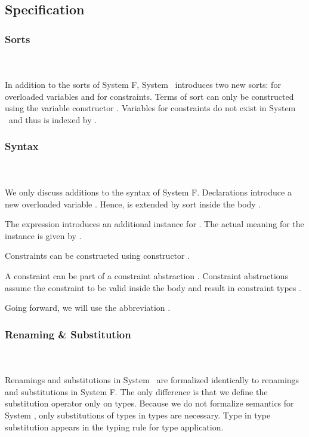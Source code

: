 \subsection{Specification}

\subsubsection{Sorts}\hfill\\\\
In addition to the sorts of System F, System \Fo\ introduces two new sorts:  for overloaded variables and  for constraints.
\FoSort
Terms of sort  can only be constructed using the variable constructor .
Variables for constraints do not exist in System \Fo\ and thus  is indexed by .

\subsubsection{Syntax}\hfill\\\\
We only discuss additions to the syntax of System F.
\FoTerm
Declarations   introduce a new overloaded variable . 
Hence,  is extended by sort  inside the body . 

\noindent The expression   \Constr{=}    introduces an additional instance for . The actual meaning for the instance is given by .

\noindent Constraints  can be constructed using constructor  \Constr{:} . 

\noindent A constraint  can be part of a constraint abstraction \Constr{\lambdabar}   . Constraint abstractions assume the constraint  to be valid inside the body  and result in constraint types \Constr{[}  \Constr{]⇒} .

\noindent Going forward, we will use the abbreviation \FoCstr.

\subsubsection{Renaming \& Substitution}\hfill\\\\
Renamings and substitutions in System \Fo\ are formalized identically to renamings and substitutions in System F. 
The only difference is that we define the substitution operator only on types. 
\Fosubs
Because we do not formalize semantics for System \Fo, only substitutions of types in types are necessary. Type in type substitution appears in the typing rule for type application.

